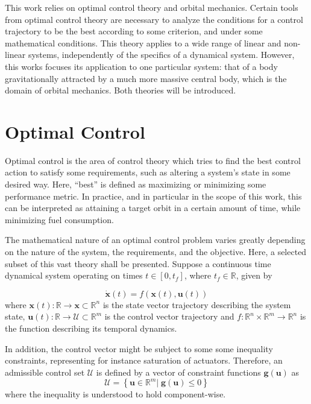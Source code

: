 
This work relies on optimal control theory and orbital mechanics. Certain tools from optimal control theory are necessary to analyze the conditions for a control trajectory to be the best according to some criterion, and under some mathematical conditions. This theory applies to a wide range of linear and non-linear systems, independently of the specifics of a dynamical system. However, this works focuses its application to one particular system: that of a body gravitationally attracted by a much more massive central body, which is the domain of orbital mechanics. Both theories will be introduced.

\section{Optimal Control}

Optimal control is the area of control theory which tries to find the best control action to satisfy some requirements, such as altering a system's state in some desired way. Here, ``best''  is defined as maximizing or minimizing some performance metric. In practice, and in particular in the scope of this work, this can be interpreted as attaining a target orbit in a certain amount of time, while minimizing fuel consumption.

The mathematical nature of an optimal control problem varies greatly depending on the nature of the system, the requirements, and the objective. Here, a selected subset of this vast theory shall be presented. Suppose a continuous time dynamical system operating on times \(t \in [0, t_f]\), where \(t_f \in \mathbb{R}\), given by

\begin{equation} \label{eq:generic_dyn}
    \dot{\mathbf{x}}(t) = f(\mathbf{x}(t), \mathbf{u}(t))
\end{equation}
where \(\mathbf{x}(t): \mathbb{R} \rightarrow \mathcal{\mathbf{x}} \subset \mathbb{R}^n\) is the state vector trajectory describing the system state, \(\mathbf{u}(t): \mathbb{R} \rightarrow \mathcal{U} \subset \mathbb{R}^m\) is the control vector trajectory and \(f: \mathbb{R}^n \times \mathbb{R}^m \rightarrow \mathbb{R}^n\) is the function describing its temporal dynamics. 

In addition, the control vector might be subject to some some inequality constraints, representing for instance saturation of actuators. Therefore, an admissible control set \(\mathcal{U}\) is defined by a vector of constraint functions \(\mathbf{g}(\mathbf{u})\) as
\begin{equation}
    \mathcal{U} = \left\{\mathbf{u} \in \mathbb{R}^m |\; \mathbf{g}(\mathbf{u}) \leq 0\right\}
\end{equation}
where the inequality is understood to hold component-wise.

